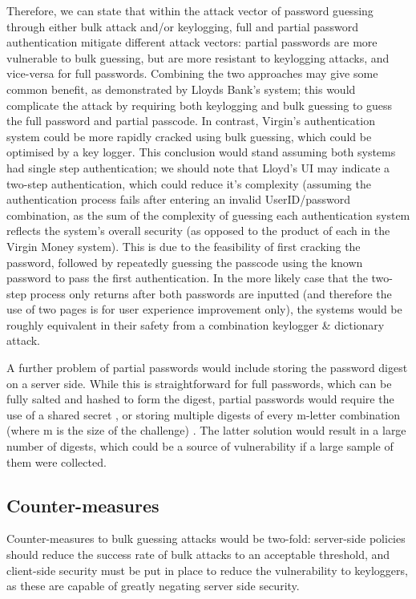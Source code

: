 \documentclass[british,11pt,a4paper]{article}
\begin{document}
Therefore, we can state that within the attack vector of password guessing through either bulk attack and/or keylogging, full and partial password authentication mitigate different attack vectors: partial passwords are more vulnerable to bulk guessing, but are more resistant to keylogging attacks, and vice-versa for full passwords. Combining the two approaches may give some common benefit, as demonstrated by Lloyds Bank's system; this would complicate the attack by requiring both keylogging and bulk guessing to guess the full password and partial passcode. In contrast, Virgin's authentication system could be more rapidly cracked using bulk guessing, which could be optimised by a key logger. This conclusion would stand assuming both systems had single step authentication; we should note that Lloyd's UI may indicate a two-step authentication, which could reduce it's complexity (assuming the authentication process fails after entering an invalid UserID/password combination, as the sum of the complexity of guessing each authentication system reflects the system's overall security (as opposed to the product of each in the Virgin Money system). This is due to the feasibility of first cracking the password, followed by repeatedly guessing the passcode using the known password to pass the first authentication. In the more likely case that the two-step process only returns after both passwords are inputted (and therefore the use of two pages is for user experience improvement only), the systems would be roughly equivalent in their safety from a combination keylogger \& dictionary attack.

A further problem of partial passwords would include storing the password digest on a server side. While this is straightforward for full passwords, which can be fully salted and hashed to form the digest, partial passwords would require the use of a shared secret \cite{smartarchitect}, or storing multiple digests of every m-letter combination (where m is the size of the challenge) \cite{smartarchitect}. The latter solution would result in a large number of digests, which could be a source of vulnerability if a large sample of them were collected. 





\subsection{Counter-measures}
Counter-measures to bulk guessing attacks would be two-fold: server-side policies should reduce the success rate of bulk attacks to an acceptable threshold, and client-side security must be put in place to reduce the vulnerability to keyloggers, as these are capable of greatly negating server side security. 
\end{document}
